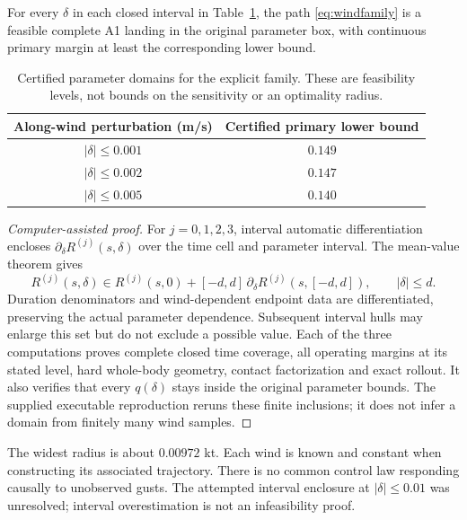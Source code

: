 \begin{proposition}\label{prop:wind}
For every $\delta$ in each closed interval in Table~\ref{tab:wind}, the path \eqref{eq:windfamily} is a feasible complete A1 landing in the original parameter box, with continuous primary margin at least the corresponding lower bound.
\end{proposition}
\begin{table}[htbp]\centering\caption{Certified parameter domains for the explicit family. These are feasibility levels, not bounds on the sensitivity or an optimality radius.}\label{tab:wind}
\begin{tabular}{cc}\toprule
Along-wind perturbation (m/s) & Certified primary lower bound\\\midrule
$|\delta|\leq0.001$ & $0.149$\\
$|\delta|\leq0.002$ & $0.147$\\
$|\delta|\leq0.005$ & $0.140$\\\bottomrule
\end{tabular}\end{table}
\begin{proof}[Computer-assisted proof]
For $j=0,1,2,3$, interval automatic differentiation encloses $\partial_\delta R^{(j)}(s,\delta)$ over the time cell and parameter interval. The mean-value theorem gives
\[
 R^{(j)}(s,\delta)\in R^{(j)}(s,0)+[-d,d]\,
 \partial_\delta R^{(j)}(s,[-d,d]),\qquad |\delta|\leq d.
\]
Duration denominators and wind-dependent endpoint data are differentiated, preserving the actual parameter dependence. Subsequent interval hulls may enlarge this set but do not exclude a possible value. Each of the three computations proves complete closed time coverage, all operating margins at its stated level, hard whole-body geometry, contact factorization and exact rollout. It also verifies that every $q(\delta)$ stays inside the original parameter bounds. The supplied executable reproduction reruns these finite inclusions; it does not infer a domain from finitely many wind samples.
\end{proof}

The widest radius is about $0.00972$ kt. Each wind is known and constant when constructing its associated trajectory. There is no common control law responding causally to unobserved gusts. The attempted interval enclosure at $|\delta|\leq0.01$ was unresolved; interval overestimation is not an infeasibility proof.


